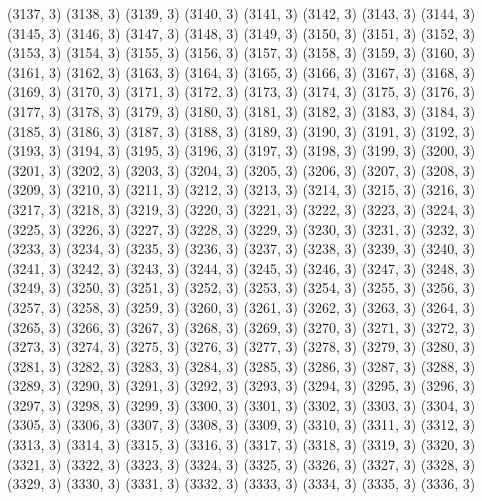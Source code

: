 {   (3137, 3)
   (3138, 3)
   (3139, 3)
   (3140, 3)
   (3141, 3)
   (3142, 3)
   (3143, 3)
   (3144, 3)
   (3145, 3)
   (3146, 3)
   (3147, 3)
   (3148, 3)
   (3149, 3)
   (3150, 3)
   (3151, 3)
   (3152, 3)
   (3153, 3)
   (3154, 3)
   (3155, 3)
   (3156, 3)
   (3157, 3)
   (3158, 3)
   (3159, 3)
   (3160, 3)
   (3161, 3)
   (3162, 3)
   (3163, 3)
   (3164, 3)
   (3165, 3)
   (3166, 3)
   (3167, 3)
   (3168, 3)
   (3169, 3)
   (3170, 3)
   (3171, 3)
   (3172, 3)
   (3173, 3)
   (3174, 3)
   (3175, 3)
   (3176, 3)
   (3177, 3)
   (3178, 3)
   (3179, 3)
   (3180, 3)
   (3181, 3)
   (3182, 3)
   (3183, 3)
   (3184, 3)
   (3185, 3)
   (3186, 3)
   (3187, 3)
   (3188, 3)
   (3189, 3)
   (3190, 3)
   (3191, 3)
   (3192, 3)
   (3193, 3)
   (3194, 3)
   (3195, 3)
   (3196, 3)
   (3197, 3)
   (3198, 3)
   (3199, 3)
   (3200, 3)
   (3201, 3)
   (3202, 3)
   (3203, 3)
   (3204, 3)
   (3205, 3)
   (3206, 3)
   (3207, 3)
   (3208, 3)
   (3209, 3)
   (3210, 3)
   (3211, 3)
   (3212, 3)
   (3213, 3)
   (3214, 3)
   (3215, 3)
   (3216, 3)
   (3217, 3)
   (3218, 3)
   (3219, 3)
   (3220, 3)
   (3221, 3)
   (3222, 3)
   (3223, 3)
   (3224, 3)
   (3225, 3)
   (3226, 3)
   (3227, 3)
   (3228, 3)
   (3229, 3)
   (3230, 3)
   (3231, 3)
   (3232, 3)
   (3233, 3)
   (3234, 3)
   (3235, 3)
   (3236, 3)
   (3237, 3)
   (3238, 3)
   (3239, 3)
   (3240, 3)
   (3241, 3)
   (3242, 3)
   (3243, 3)
   (3244, 3)
   (3245, 3)
   (3246, 3)
   (3247, 3)
   (3248, 3)
   (3249, 3)
   (3250, 3)
   (3251, 3)
   (3252, 3)
   (3253, 3)
   (3254, 3)
   (3255, 3)
   (3256, 3)
   (3257, 3)
   (3258, 3)
   (3259, 3)
   (3260, 3)
   (3261, 3)
   (3262, 3)
   (3263, 3)
   (3264, 3)
   (3265, 3)
   (3266, 3)
   (3267, 3)
   (3268, 3)
   (3269, 3)
   (3270, 3)
   (3271, 3)
   (3272, 3)
   (3273, 3)
   (3274, 3)
   (3275, 3)
   (3276, 3)
   (3277, 3)
   (3278, 3)
   (3279, 3)
   (3280, 3)
   (3281, 3)
   (3282, 3)
   (3283, 3)
   (3284, 3)
   (3285, 3)
   (3286, 3)
   (3287, 3)
   (3288, 3)
   (3289, 3)
   (3290, 3)
   (3291, 3)
   (3292, 3)
   (3293, 3)
   (3294, 3)
   (3295, 3)
   (3296, 3)
   (3297, 3)
   (3298, 3)
   (3299, 3)
   (3300, 3)
   (3301, 3)
   (3302, 3)
   (3303, 3)
   (3304, 3)
   (3305, 3)
   (3306, 3)
   (3307, 3)
   (3308, 3)
   (3309, 3)
   (3310, 3)
   (3311, 3)
   (3312, 3)
   (3313, 3)
   (3314, 3)
   (3315, 3)
   (3316, 3)
   (3317, 3)
   (3318, 3)
   (3319, 3)
   (3320, 3)
   (3321, 3)
   (3322, 3)
   (3323, 3)
   (3324, 3)
   (3325, 3)
   (3326, 3)
   (3327, 3)
   (3328, 3)
   (3329, 3)
   (3330, 3)
   (3331, 3)
   (3332, 3)
   (3333, 3)
   (3334, 3)
   (3335, 3)
   (3336, 3)
}
